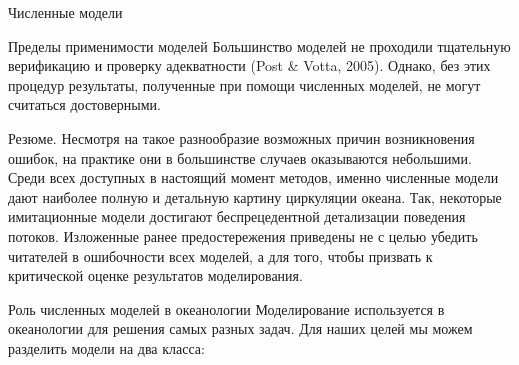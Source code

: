 \begin{chapter}{Численные модели}
\begin{section}{Пределы применимости моделей}
Большинство моделей не проходили тщательную верификацию и проверку
адекватности (Post \& Votta, 2005). Однако, без этих процедур результаты,
полученные при помощи численных моделей, не могут считаться достоверными.
%

\begin{paragraph}{Резюме.}
Несмотря на такое разнообразие возможных причин возникновения ошибок, 
на практике они в большинстве случаев оказываются небольшими.
Среди всех доступных в настоящий момент методов, именно численные модели
дают наиболее полную и детальную картину циркуляции океана. 
Так, некоторые имитационные модели достигают беспрецедентной детализации 
поведения потоков. Изложенные ранее предостережения приведены не с целью 
убедить читателей в ошибочности всех моделей, а для того, чтобы призвать
к критической оценке результатов моделирования.
%
\end{paragraph}
\end{section}

\begin{section}{Роль численных моделей в океанологии}
Моделирование используется в океанологии для решения самых разных
задач. Для наших целей мы можем разделить модели на два класса:
%


\end{section}
\end{chapter}
